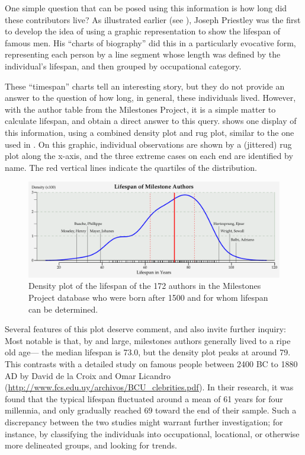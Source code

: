 One simple question that can be posed using this information is how long did these contributors live? 
As illustrated earlier (see ), Joseph Priestley was the first to develop the idea of using a graphic 
representation to show the lifespan of famous men. His ``charts of biography'' did this in a particularly evocative form, 
representing each person by a line segment whose length was defined by the individual's lifespan, and then grouped by occupational category.

These ``timespan'' charts tell an interesting story, but they do not provide an answer to the question of how long, in general, these individuals lived.  However, with the author table from the Milestones Project, it is a simple matter to calculate lifespan, and obtain a direct answer to this query.  shows one display of this information, using a combined density plot and rug plot, similar to the one used in . On this graphic, individual observations are shown by a (jittered) rug plot along the x-axis, and the three extreme cases on each end are identified by name.  The red vertical lines indicate the quartiles of the distribution.

\begin{figure}[!htb]
  \centering
  \includegraphics[width=\textwidth,clip]{fig/lifespan3}
  \caption{Density plot of the lifespan of the 172 authors in the Milestones Project database who were born after 1500 and for whom lifespan can be determined.}
  \label{fig:lifespan}
\end{figure}

Several features of this plot deserve comment, and also invite further inquiry: Most notable is that, by and large, milestones authors generally lived to a ripe old age--- the median lifespan is 73.0, but the density plot peaks at around 79. This contrasts with a detailed study on famous people between 2400 BC to 1880 AD by David de la Croix and Omar Licandro (\url{http://www.fcs.edu.uy/archivos/BCU_clebrities.pdf}).  In their research, it was found that the typical lifespan fluctuated around a mean of 61 years for four millennia, and only gradually reached 69 toward the end of their sample. Such a discrepancy between the two studies might warrant further investigation; for instance, by classifying the individuals into occupational, locational, or otherwise more delineated groups, and looking for trends.

